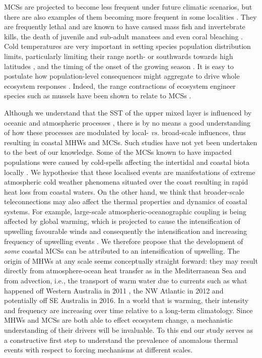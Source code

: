 \documentclass[a4paper,10pt,review]{elsarticle}
\begin{document}
MCSs are projected to become less frequent under future climatic scenarios, but there are also examples of them becoming more frequent in some localities \citep[e.g.][]{Gershunov2008, Matthes2015}. They are frequently lethal \citep{Woodward1987} and are known to have caused mass fish \citep{Gunter1941, Gunter1951, Holt1983} and invertebrate \citep{Gunter1951, Crisp1964} kills, the death of juvenile and sub-adult manatees \citep{OShea1985, Marsh1986} and even coral bleaching \citep{Lirman2011}. Cold temperatures are very important in setting species population distribution limits, particularly limiting their range north- or southwards towards high latitudes \citep{Firth2011}, and the timing of the onset of the growing season \citep{Jentsch2007}. It is easy to postulate how population-level consequences might aggregate to drive whole ecosystem responses \citep[e.g.][]{Kreyling2008, Rehage2016}. Indeed, the range contractions of ecosystem engineer species such as mussels have been shown to relate to MCSs \citep{Firth2011, Firth2015}.

Although we understand that the SST of the upper mixed layer is influenced by oceanic and atmospheric processes \citep[see Equation 1 of][]{Deser2010}, there is by no means a good understanding of how these processes are modulated by local- \emph{vs.} broad-scale influences, thus resulting in coastal MHWs and MCSs. Such studies have not yet been undertaken to the best of our knowledge. Some of the MCSs known to have impacted populations were caused by cold-spells affecting the intertidal and coastal biota locally \citep{Gunter1941, Firth2011}. We hypothesise that these localised events are manifestations of extreme atmospheric cold weather phenomena situated over the coast resulting in rapid heat loss from coastal waters. On the other hand, we think that broader-scale teleconnections may also affect the thermal properties and dynamics of coastal systems. For example, large-scale atmospheric-oceanographic coupling is being affected by global warming, which is projected to cause the intensification of upwelling favourable winds and consequently the intensification and increasing frequency of upwelling events \citep[see][for a review of this and alternative hypotheses]{Garcia-Reyes2015}. We therefore propose that the development of \emph{some} coastal MCSs can be attributed to an intensification of upwelling. The origin of MHWs at any scale seems conceptually straight forward: they may result directly from atmosphere-ocean heat transfer as in the Mediterranean Sea \citep[e.g.][]{Garrabou2009} and from advection, i.e., the transport of warm water due to currents such as what happened off Western Australia in 2011 \citep{Feng2013, Benthuysen2014}, the NW Atlantic in 2012 \citep{Mills2012, Chen2014, Chen2015} and potentially off SE Australia in 2016. In a world that is warming, their intensity and frequency are increasing over time relative to a long-term climatology. Since MHWs and MCSs are both able to effect ecosystem change, a mechanistic understanding of their drivers will be invaluable. To this end our study serves as a constructive first step to understand the prevalence of anomalous thermal events with respect to forcing mechanisms at different scales.
\end{document}

